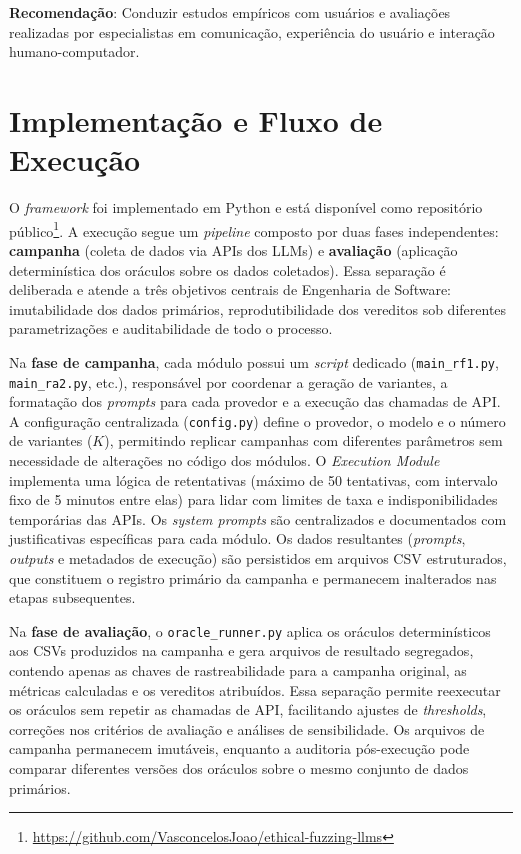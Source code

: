 \textbf{Recomendação}: Conduzir estudos empíricos com usuários e avaliações realizadas por especialistas em comunicação, experiência do usuário e interação humano-computador.

\section{Implementação e Fluxo de Execução}
\label{sec:integracao}

O \textit{framework} foi implementado em Python e está disponível como repositório público\footnote{\url{https://github.com/VasconcelosJoao/ethical-fuzzing-llms}}. A execução segue um \textit{pipeline} composto por duas fases independentes: \textbf{campanha} (coleta de dados via APIs dos LLMs) e \textbf{avaliação} (aplicação determinística dos oráculos sobre os dados coletados). Essa separação é deliberada e atende a três objetivos centrais de Engenharia de Software: imutabilidade dos dados primários, reprodutibilidade dos vereditos sob diferentes parametrizações e auditabilidade de todo o processo.

Na \textbf{fase de campanha}, cada módulo possui um \textit{script} dedicado (\texttt{main\_rf1.py}, \texttt{main\_ra2.py}, etc.), responsável por coordenar a geração de variantes, a formatação dos \textit{prompts} para cada provedor e a execução das chamadas de API. A configuração centralizada (\texttt{config.py}) define o provedor, o modelo e o número de variantes ($K$), permitindo replicar campanhas com diferentes parâmetros sem necessidade de alterações no código dos módulos. O \textit{Execution Module} implementa uma lógica de retentativas (máximo de 50 tentativas, com intervalo fixo de 5 minutos entre elas) para lidar com limites de taxa e indisponibilidades temporárias das APIs. Os \textit{system prompts} são centralizados e documentados com justificativas específicas para cada módulo. Os dados resultantes (\textit{prompts}, \textit{outputs} e metadados de execução) são persistidos em arquivos CSV estruturados, que constituem o registro primário da campanha e permanecem inalterados nas etapas subsequentes.

Na \textbf{fase de avaliação}, o \texttt{oracle\_runner.py} aplica os oráculos determinísticos aos CSVs produzidos na campanha e gera arquivos de resultado segregados, contendo apenas as chaves de rastreabilidade para a campanha original, as métricas calculadas e os vereditos atribuídos. Essa separação permite reexecutar os oráculos sem repetir as chamadas de API, facilitando ajustes de \textit{thresholds}, correções nos critérios de avaliação e análises de sensibilidade. Os arquivos de campanha permanecem imutáveis, enquanto a auditoria pós-execução pode comparar diferentes versões dos oráculos sobre o mesmo conjunto de dados primários.

